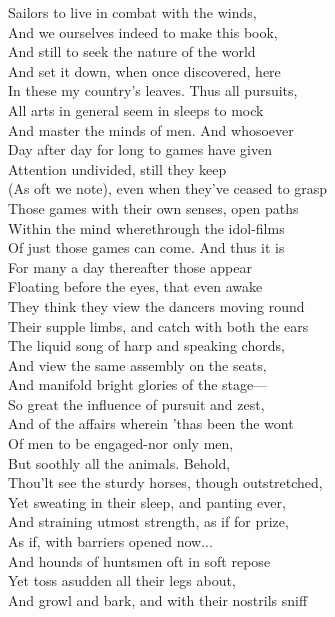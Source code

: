 Sailors to live in combat with the winds,\\
And we ourselves indeed to make this book,\\
And still to seek the nature of the world\\
And set it down, when once discovered, here\\
In these my country's leaves. Thus all pursuits,\\
All arts in general seem in sleeps to mock\\
And master the minds of men. And whosoever\\
Day after day for long to games have given\\
Attention undivided, still they keep\\
(As oft we note), even when they've ceased to grasp\\
Those games with their own senses, open paths\\
Within the mind wherethrough the idol-films\\
Of just those games can come. And thus it is\\
For many a day thereafter those appear\\
Floating before the eyes, that even awake\\
They think they view the dancers moving round\\
Their supple limbs, and catch with both the ears\\
The liquid song of harp and speaking chords,\\
And view the same assembly on the seats,\\
And manifold bright glories of the stage—\\
So great the influence of pursuit and zest,\\
And of the affairs wherein 'thas been the wont\\
Of men to be engaged-nor only men,\\
But soothly all the animals. Behold,\\
Thou'lt see the sturdy horses, though outstretched,\\
Yet sweating in their sleep, and panting ever,\\
And straining utmost strength, as if for prize,\\
As if, with barriers opened now...\\
And hounds of huntsmen oft in soft repose\\
Yet toss asudden all their legs about,\\
And growl and bark, and with their nostrils sniff\\
